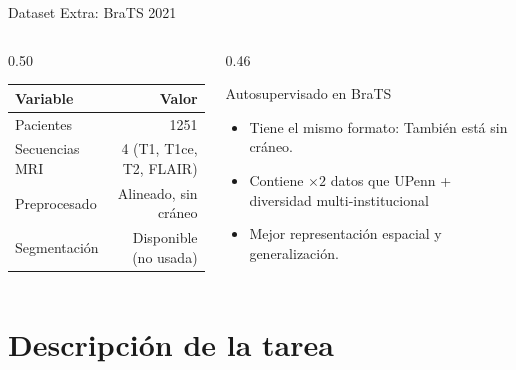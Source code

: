 \documentclass[aspectratio=169]{beamer}
\begin{document}
\begin{frame}{Dataset Extra: BraTS 2021}
  \begin{columns}[c] %
    \begin{column}{0.50\textwidth}
      \centering\footnotesize
      \begin{tabular}{lr}
        \toprule
        \textbf{Variable} & \textbf{Valor} \\
        \midrule
        Pacientes              & 1251 \\
        Secuencias MRI         & 4 (T1, T1ce, T2, FLAIR) \\
        Preprocesado           & Alineado, sin cráneo \\
        Segmentación           & Disponible (no usada) \\
        \bottomrule
      \end{tabular}
    \end{column}
    
    \begin{column}{0.46\textwidth}
      \begin{block}{Autosupervisado en BraTS}
        \small
        \begin{itemize}
          \item Tiene el mismo formato: También está sin cráneo.
          \item Contiene $\times2$ datos que UPenn + diversidad multi-institucional
          \item Mejor representación espacial y generalización.
        \end{itemize}
      \end{block}
    \end{column}
  \end{columns}
\end{frame}

\section{Descripción de la tarea}
\end{document}
